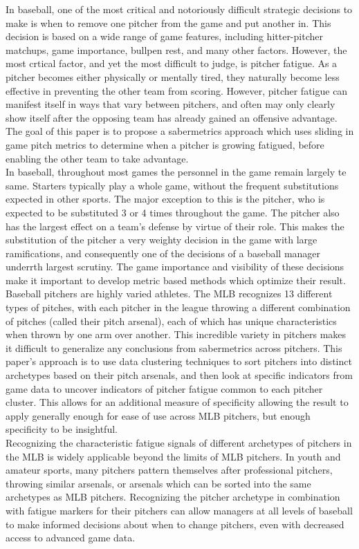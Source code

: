 \documentclass[12 pt]{article}
\begin{document}
\indent In baseball, one of the most critical and notoriously difficult strategic 
decisions to make is when to remove one pitcher from the game and put another in.
This decision is based on a wide range of game features, including hitter-pitcher 
matchups, game importance, bullpen rest, and many other factors. However, the most 
crtical factor, and yet the most difficult to judge, is pitcher fatigue. As a pitcher 
becomes either physically or mentally tired, they naturally become less effective
in preventing the other team from scoring. However, pitcher fatigue can manifest itself in ways 
that vary between pitchers, and often may only clearly show itself after the opposing 
team has already gained an offensive advantage. The goal of this paper is to propose 
a sabermetrics approach which uses sliding in game pitch metrics to determine when a 
pitcher is growing fatigued, before enabling the other team to take advantage.
\\ \indent In baseball, throughout most games the personnel in the game remain largely te same. 
Starters typically play a whole game, without the frequent substitutions expected 
in other sports. The major exception to this is the pitcher, who is expected to be substituted 3 or 4
times throughout the game. The pitcher also has the largest effect on a team's 
defense by virtue of their role. This makes the substitution of the pitcher 
a very weighty decision in the game with large ramifications, and consequently one of 
the decisions of a baseball manager underrth largest scrutiny. The game importance and 
visibility of these decisions make it important to develop metric based methods which 
optimize their result. 
\\ \indent Baseball pitchers are highly varied athletes. The MLB recognizes 13 
different types of pitches, with each pitcher in the league throwing a
different combination of pitches (called their pitch arsenal), each of which has 
unique characteristics when thrown by one arm over another. This incredible variety 
in pitchers makes it difficult to generalize any conclusions from sabermetrics 
across pitchers. This paper's approach is to use data clustering techniques to 
sort pitchers into distinct archetypes based on their pitch arsenals, and then 
look at specific indicators from game data to uncover indicators of pitcher fatigue 
common to each pitcher cluster. This allows for an additional measure of specificity 
allowing the result to apply generally enough for ease of use across MLB pitchers, 
but enough specificity to be insightful.
\\ \indent Recognizing the characteristic fatigue signals of different archetypes of 
pitchers in the MLB is widely applicable beyond the limits of MLB pitchers. In youth and 
amateur sports, many pitchers pattern themselves after professional pitchers, throwing similar 
arsenals, or arsenals which can be sorted into the same archetypes as MLB pitchers. 
Recognizing the pitcher archetype in combination with fatigue markers for their pitchers can allow 
managers at all levels of baseball to make informed decisions about when to change pitchers, 
even with decreased access to advanced game data. \\
\end{document}
